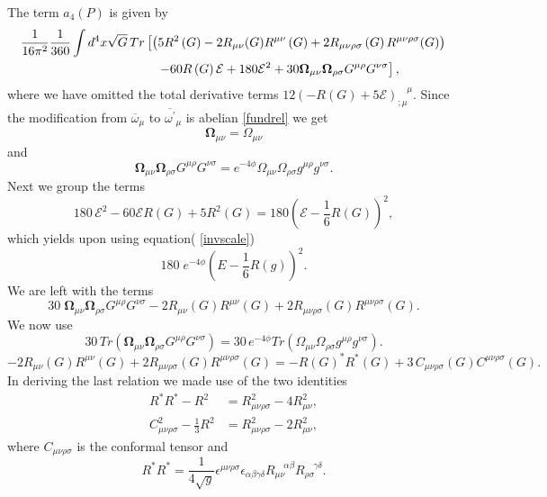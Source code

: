 \documentclass[12pt]{article}%
\begin{document}
The term $a_{4}\left(  P\right)  $ is given by
\begin{align*}
&  \frac{1}{16\pi^{2}}\frac{1}{360}\int d^{4}x\sqrt{G}\,Tr\left[  \left(
5R^{2}\left(  G\right)  -2R_{\mu\nu}(G)R^{\mu\nu}\left(  G\right)  +2R_{\mu
\nu\rho\sigma}\left(  G\right)  R^{\mu\nu\rho\sigma}(G)\right)  \right. \\
&  \hspace{1in}\hspace{0.5in}\left.  -60R\left(  G\right)  \mathcal{E}%
+180\mathcal{E}^{2}+30\mathbf{\Omega}_{\mu\nu}\mathbf{\Omega}_{\rho\sigma
}G^{\mu\rho}G^{\nu\sigma}\right]  ,
\end{align*}
where we have omitted the total derivative terms $12\left(  -R\left(
G\right)  +5\mathcal{E}\right)  _{;\mu}^{\quad\mu}$. Since the modification
from $\overline{\omega}_{\mu}$ to $\overline{\omega^{\prime}}_{\mu}$ is
abelian \eqref{fundrel} we get%
\[
\mathbf{\Omega}_{\mu\nu}=\Omega_{\mu\nu}%
\]
and
\[
\mathbf{\Omega}_{\mu\nu}\mathbf{\Omega}_{\rho\sigma}G^{\mu\rho}G^{\nu\sigma
}=e^{-4\phi}\Omega_{\mu\nu}\Omega_{\rho\sigma}g^{\mu\rho}g^{\nu\sigma}.
\]
Next we group the terms
\[
180\,\mathcal{E}^{2}-60\mathcal{E}R(G)+5R^{2}\left(  G\right)  =180\left(
\mathcal{E}-\frac{1}{6}R\left(  G\right)  \right)  ^{2},
\]
which yields upon using equation( \ref{invscale})
\[
180\;e^{-4\phi}\left(  E-\frac{1}{6}R\left(  g\right)  \right)  ^{2}.
\]
We are left with the terms
\[
30\;\mathbf{\Omega}_{\mu\nu}\mathbf{\Omega}_{\rho\sigma}G^{\mu\rho}%
G^{\nu\sigma}-2R_{\mu\nu}(G)R^{\mu\nu}\left(  G\right)  +2R_{\mu\nu\rho\sigma
}\left(  G\right)  R^{\mu\nu\rho\sigma}(G).
\]
We now use
\[
30\,Tr\left(  \mathbf{\Omega}_{\mu\nu}\mathbf{\Omega}_{\rho\sigma}G^{\mu\rho
}G^{\nu\sigma}\right)  =30\,e^{-4\phi}Tr\left(  \Omega_{\mu\nu}\Omega
_{\rho\sigma}g^{\mu\rho}g^{\nu\sigma}\right)  .
\]%
\[
-2R_{\mu\nu}(G)R^{\mu\nu}\left(  G\right)  +2R_{\mu\nu\rho\sigma}\left(
G\right)  R^{\mu\nu\rho\sigma}(G)=-R(G)^{\ast}R^{\ast}(G)+3\,C_{\mu\nu
\rho\sigma}\left(  G\right)  C^{\mu\nu\rho\sigma}\left(  G\right)  .
\]
In deriving the last relation we made use of the two identities
\begin{align*}
R^{\ast}R^{\ast}-R^{2}  &  =R_{\mu\nu\rho\sigma}^{2}-4R_{\mu\nu}^{2},\\
C_{\mu\nu\rho\sigma}^{2}-\frac{1}{3}R^{2}  &  =R_{\mu\nu\rho\sigma}%
^{2}-2R_{\mu\nu}^{2},
\end{align*}
where $C_{\mu\nu\rho\sigma}$ is the conformal tensor and
\[
R^{\ast}R^{\ast}=\frac{1}{4\sqrt{g}}\epsilon^{\mu\nu\rho\sigma}\epsilon
_{\alpha\beta\gamma\delta}R_{\mu\nu}^{\quad\alpha\beta}R_{\rho\sigma}%
^{\quad\gamma\delta}.
\]
\end{document}
